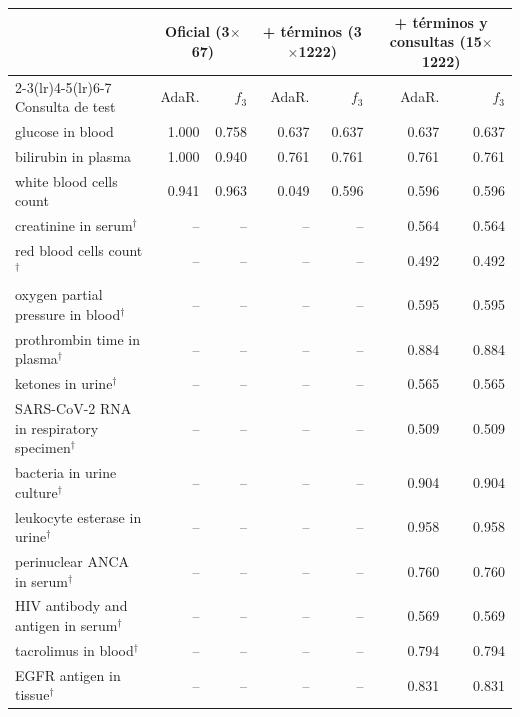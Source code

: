 \begin{tabular}{lrrrrrr}
\toprule
& \multicolumn{2}{c}{Oficial (3$\times$67)} & \multicolumn{2}{c}{+ términos (3$\times$1222)} & \multicolumn{2}{c}{+ términos y consultas (15$\times$1222)} \\
\cmidrule(lr){2-3}\cmidrule(lr){4-5}\cmidrule(lr){6-7}
Consulta de test & AdaR. & $f_3$ & AdaR. & $f_3$ & AdaR. & $f_3$ \\
\midrule
glucose in blood & 1.000 & 0.758 & 0.637 & 0.637 & 0.637 & 0.637 \\
bilirubin in plasma & 1.000 & 0.940 & 0.761 & 0.761 & 0.761 & 0.761 \\
white blood cells count & 0.941 & 0.963 & 0.049 & 0.596 & 0.596 & 0.596 \\
creatinine in serum$^\dagger$ & -- & -- & -- & -- & 0.564 & 0.564 \\
red blood cells count$^\dagger$ & -- & -- & -- & -- & 0.492 & 0.492 \\
oxygen partial pressure in blood$^\dagger$ & -- & -- & -- & -- & 0.595 & 0.595 \\
prothrombin time in plasma$^\dagger$ & -- & -- & -- & -- & 0.884 & 0.884 \\
ketones in urine$^\dagger$ & -- & -- & -- & -- & 0.565 & 0.565 \\
SARS-CoV-2 RNA in respiratory specimen$^\dagger$ & -- & -- & -- & -- & 0.509 & 0.509 \\
bacteria in urine culture$^\dagger$ & -- & -- & -- & -- & 0.904 & 0.904 \\
leukocyte esterase in urine$^\dagger$ & -- & -- & -- & -- & 0.958 & 0.958 \\
perinuclear ANCA in serum$^\dagger$ & -- & -- & -- & -- & 0.760 & 0.760 \\
HIV antibody and antigen in serum$^\dagger$ & -- & -- & -- & -- & 0.569 & 0.569 \\
tacrolimus in blood$^\dagger$ & -- & -- & -- & -- & 0.794 & 0.794 \\
EGFR antigen in tissue$^\dagger$ & -- & -- & -- & -- & 0.831 & 0.831 \\
\bottomrule
\end{tabular}
